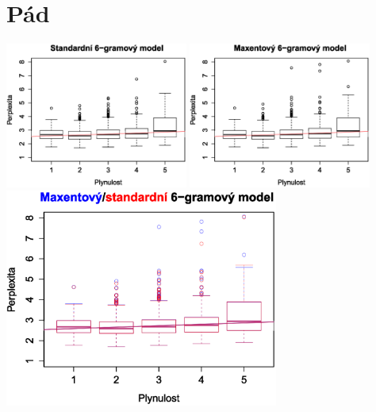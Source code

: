 \documentclass[12pt,a4paper]{report}
\begin{document}
\section{Pád}
\begin{center}
	\includegraphics[width=60mm]{./grafy/morf/ngram/pad.svg.eps}
	\includegraphics[width=60mm]{./grafy/morf/maxent/pad.svg.eps}	
	\includegraphics[width=90mm]{./grafy/morf/porovnani/pad.svg.eps}	
\end{center}
\end{document}

